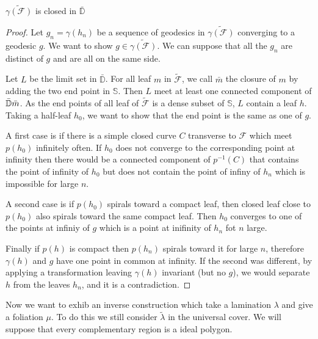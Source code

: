 \begin{lem}
$\tilde{\gamma(\mathcal{F})}$ is closed in $\bar{\mathbb{D}}$
\end{lem}

\begin{proof}

Let $g_n=\gamma(h_n)$ be a sequence of geodesics in $\tilde{\gamma(\mathcal{F})}$ converging to a geodesic $g$. We want to show $g \in \tilde{\gamma(\mathcal{F})}$. We can suppose that all the $g_n$ are distinct of $g$ and are all on the same side.

\smallbreak
Let $L$ be the limit set in $\bar{\mathbb{D}}$. For all leaf $m$ in $\tilde{\mathcal{F}}$, we call $\bar{m}$ the closure of $m$
 by adding the two end point in $\mathbb{S}$. Then $L$ meet at least one connected component of $\bar{\mathbb{D}} \\ \bar{m} $. As the end points of all leaf of $\tilde{\mathcal{F}}$ is a dense subset of $\mathbb{S}$, $L$ contain a leaf $h$. Taking a half-leaf $h_0$, we want to show that the end point is the same as one of $g$.

\smallbreak
A first case is if there is a simple closed curve $C$  transverse to $\mathcal{F}$ which meet $p(h_0)$ infinitely often. If $h_0$ does not converge to the corresponding point at infinity then there would be a connected component of $p^{-1}(C)$ that contains the point of infinity of $h_0$ but does not contain the point of infiny of $h_n$ which is impossible for large $n$.

\smallbreak
A second case is if $p(h_0)$ spirals toward a compact leaf, then closed leaf close to $p(h_0)$ also spirals toward the same compact leaf. Then $h_0$ converges to one of the points at infiniy of $g$ which is a point at inifinity of $h_n$ fot $n$ large.
\smallbreak

Finally if $p(h)$ is compact then $p(h_n)$ spirals toward it for large $n$, therefore $\gamma(h)$ and $g$ have one point in common at infinity. If the second was different, by applying a transformation leaving $\gamma(h)$ invariant (but no $g$), we would separate $h$ from the leaves $h_n$, and it is a contradiction.
\end{proof}

Now we want to exhib an inverse construction which take a lamination $\lambda$ and give a foliation $\mu$. To do this we still consider $\tilde{\lambda}$ in the universal cover. We will suppose that every complementary region is a ideal polygon.

